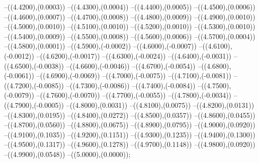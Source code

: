 {	--({\sx*(4.4200)},{\sy*(0.0003)})
	--({\sx*(4.4300)},{\sy*(0.0004)})
	--({\sx*(4.4400)},{\sy*(0.0005)})
	--({\sx*(4.4500)},{\sy*(0.0006)})
	--({\sx*(4.4600)},{\sy*(0.0007)})
	--({\sx*(4.4700)},{\sy*(0.0008)})
	--({\sx*(4.4800)},{\sy*(0.0009)})
	--({\sx*(4.4900)},{\sy*(0.0010)})
	--({\sx*(4.5000)},{\sy*(0.0010)})
	--({\sx*(4.5100)},{\sy*(0.0010)})
	--({\sx*(4.5200)},{\sy*(0.0010)})
	--({\sx*(4.5300)},{\sy*(0.0010)})
	--({\sx*(4.5400)},{\sy*(0.0009)})
	--({\sx*(4.5500)},{\sy*(0.0008)})
	--({\sx*(4.5600)},{\sy*(0.0006)})
	--({\sx*(4.5700)},{\sy*(0.0004)})
	--({\sx*(4.5800)},{\sy*(0.0001)})
	--({\sx*(4.5900)},{\sy*(-0.0002)})
	--({\sx*(4.6000)},{\sy*(-0.0007)})
	--({\sx*(4.6100)},{\sy*(-0.0012)})
	--({\sx*(4.6200)},{\sy*(-0.0017)})
	--({\sx*(4.6300)},{\sy*(-0.0024)})
	--({\sx*(4.6400)},{\sy*(-0.0031)})
	--({\sx*(4.6500)},{\sy*(-0.0038)})
	--({\sx*(4.6600)},{\sy*(-0.0046)})
	--({\sx*(4.6700)},{\sy*(-0.0054)})
	--({\sx*(4.6800)},{\sy*(-0.0061)})
	--({\sx*(4.6900)},{\sy*(-0.0069)})
	--({\sx*(4.7000)},{\sy*(-0.0075)})
	--({\sx*(4.7100)},{\sy*(-0.0081)})
	--({\sx*(4.7200)},{\sy*(-0.0085)})
	--({\sx*(4.7300)},{\sy*(-0.0086)})
	--({\sx*(4.7400)},{\sy*(-0.0084)})
	--({\sx*(4.7500)},{\sy*(-0.0079)})
	--({\sx*(4.7600)},{\sy*(-0.0070)})
	--({\sx*(4.7700)},{\sy*(-0.0055)})
	--({\sx*(4.7800)},{\sy*(-0.0034)})
	--({\sx*(4.7900)},{\sy*(-0.0005)})
	--({\sx*(4.8000)},{\sy*(0.0031)})
	--({\sx*(4.8100)},{\sy*(0.0075)})
	--({\sx*(4.8200)},{\sy*(0.0131)})
	--({\sx*(4.8300)},{\sy*(0.0195)})
	--({\sx*(4.8400)},{\sy*(0.0272)})
	--({\sx*(4.8500)},{\sy*(0.0357)})
	--({\sx*(4.8600)},{\sy*(0.0455)})
	--({\sx*(4.8700)},{\sy*(0.0560)})
	--({\sx*(4.8800)},{\sy*(0.0675)})
	--({\sx*(4.8900)},{\sy*(0.0795)})
	--({\sx*(4.9000)},{\sy*(0.0920)})
	--({\sx*(4.9100)},{\sy*(0.1035)})
	--({\sx*(4.9200)},{\sy*(0.1151)})
	--({\sx*(4.9300)},{\sy*(0.1235)})
	--({\sx*(4.9400)},{\sy*(0.1300)})
	--({\sx*(4.9500)},{\sy*(0.1317)})
	--({\sx*(4.9600)},{\sy*(0.1278)})
	--({\sx*(4.9700)},{\sy*(0.1148)})
	--({\sx*(4.9800)},{\sy*(0.0920)})
	--({\sx*(4.9900)},{\sy*(0.0548)})
	--({\sx*(5.0000)},{\sy*(0.0000)});
}

